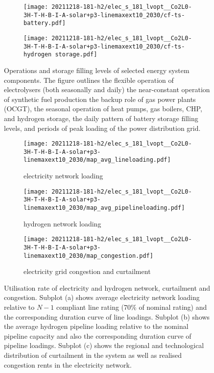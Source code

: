 \begin{figure}
\begin{subfigure}{0.49\textwidth}
        \texttt{[image: 20211218-181-h2/elec\_s\_181\_lvopt\_\_Co2L0-3H-T-H-B-I-A-solar+p3-linemaxext10\_2030/cf-ts-battery.pdf]}
    \end{subfigure}
    \begin{subfigure}{0.49\textwidth}
        \centering
        \texttt{[image: 20211218-181-h2/elec\_s\_181\_lvopt\_\_Co2L0-3H-T-H-B-I-A-solar+p3-linemaxext10\_2030/cf-ts-hydrogen storage.pdf]}
    \end{subfigure}
    \caption{Operations and storage filling levels of selected energy system components. The figure outlines
    the flexible operation of electrolysers (both seasonally and daily)
    the near-constant operation of synthetic fuel production
    the backup role of gas power plants (OCGT),
    the seasonal operation of heat pumps, gas boilers, CHP, and hydrogen storage,
    the daily pattern of battery storage filling levels, and
    periods of peak loading of the power distribution grid.
    }
    \label{fig:si:utilisation-rate-ts}
\end{figure}


\begin{figure}
    \centering
    \begin{subfigure}{0.49\textwidth}
        \centering
        \caption{electricity network loading}
        \texttt{[image: 20211218-181-h2/elec\_s\_181\_lvopt\_\_Co2L0-3H-T-H-B-I-A-solar+p3-linemaxext10\_2030/map\_avg\_lineloading.pdf]}
    \end{subfigure}
    \begin{subfigure}{0.49\textwidth}
        \centering
        \caption{hydrogen network loading}
        \texttt{[image: 20211218-181-h2/elec\_s\_181\_lvopt\_\_Co2L0-3H-T-H-B-I-A-solar+p3-linemaxext10\_2030/map\_avg\_pipelineloading.pdf]}
    \end{subfigure}
    \begin{subfigure}{0.65\textwidth}
        \vspace{1cm}
        \centering
        \caption{electricity grid congestion and curtailment}
        \texttt{[image: 20211218-181-h2/elec\_s\_181\_lvopt\_\_Co2L0-3H-T-H-B-I-A-solar+p3-linemaxext10\_2030/map\_congestion.pdf]}
    \end{subfigure}
    \caption{Utilisation rate of electricity and hydrogen network, curtailment and congestion. Subplot (a) shows average electricity network loading relative to $N-1$ compliant line rating (70\% of nominal rating) and the corresponding duration curve of line loadings. Subplot (b) shows the average hydrogen pipeline loading relative to the nominal pipeline capacity and also the corresponding duration curve of pipeline loadings. Subplot (c) shows the regional and technological distribution of curtailment in the system as well as realised congestion rents in the electricity network.}
    \label{fig:si:grid-utilisation}
\end{figure}
